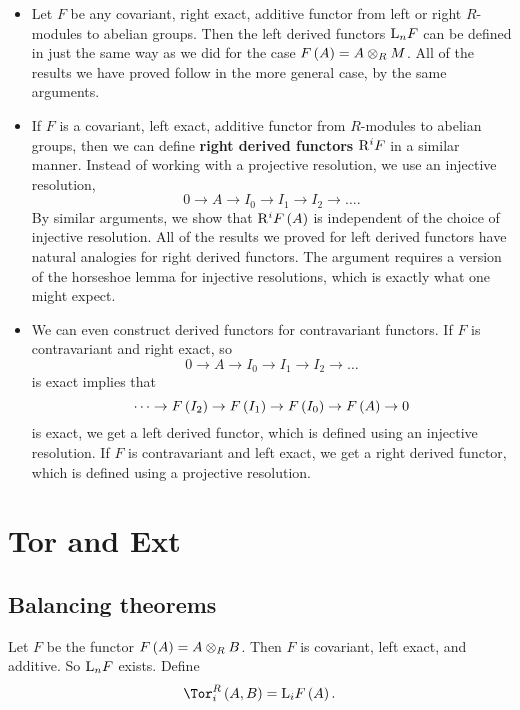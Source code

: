 \begin{proposition}
\hfill
\begin{itemize}
\item Let $ F $ be any covariant, right exact, additive functor from left or right $ R $-modules to abelian groups. Then the left derived functors $ \mathrm{L}_nF $ can be defined in just the same way as we did for the case $ F\br{A} = A \otimes_R M $. All of the results we have proved follow in the more general case, by the same arguments.
\item If $ F $ is a covariant, left exact, additive functor from $ R $-modules to abelian groups, then we can define \textbf{right derived functors} $ \mathrm{R}^iF $ in a similar manner. Instead of working with a projective resolution, we use an injective resolution,
$$ 0 \to A \to I_0 \to I_1 \to I_2 \to \dots. $$
By similar arguments, we show that $ \R^iF\br{A} $ is independent of the choice of injective resolution. All of the results we proved for left derived functors have natural analogies for right derived functors. The argument requires a version of the horseshoe lemma for injective resolutions, which is exactly what one might expect.
\item We can even construct derived functors for contravariant functors. If $ F $ is contravariant and right exact, so
$$ 0 \to A \to I_0 \to I_1 \to I_2 \to \dots $$
is exact implies that
$$ \dots \to F\br{I_2} \to F\br{I_1} \to F\br{I_0} \to F\br{A} \to 0 $$
is exact, we get a left derived functor, which is defined using an injective resolution. If $ F $ is contravariant and left exact, we get a right derived functor, which is defined using a projective resolution.
\end{itemize}
\end{proposition}

\pagebreak

\section{Tor and Ext}

\subsection{Balancing theorems}

\begin{definition}
Let $ F $ be the functor $ F\br{A} = A \otimes_R B $. Then $ F $ is covariant, left exact, and additive. So $ \mathrm{L}_nF $ exists. Define
$$ \Tor_i^R\br{A, B} = \L_iF\br{A}. $$
\end{definition}

